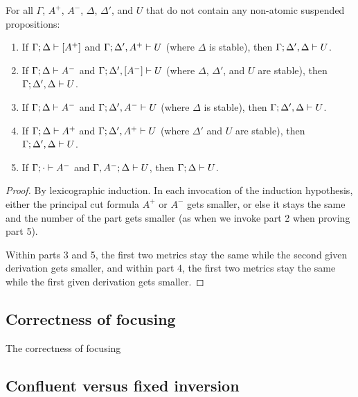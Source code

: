 \bigskip
\begin{theorem}\label{thm:lincut}
For all $\Gamma$, $A^+$, $A^-$, $\Delta$, $\Delta'$, and $U$ that
do not contain any non-atomic suspended propositions:
\begin{enumerate}
\item If ${\Gamma};{\Delta} \vdash {[A^+]} \mathstrut$
      and ${\Gamma};{\Delta',A^+} \vdash {U} \mathstrut$
      (where $\Delta$ is stable), 
      then ${\Gamma};{\Delta',\Delta} \vdash {U} \mathstrut$.
\item If ${\Gamma};{\Delta} \vdash {A^-} \mathstrut$
      and ${\Gamma};{\Delta', [A^-]} \vdash {U} \mathstrut$
      (where $\Delta$, $\Delta'$, and $U$ are stable),
      then ${\Gamma};{\Delta',\Delta} \vdash {U} \mathstrut$. 
\item If ${\Gamma};{\Delta} \vdash {A^-} \mathstrut$
      and ${\Gamma};{\Delta', A^-} \vdash {U} \mathstrut$
      (where $\Delta$ is stable), 
      then ${\Gamma};{\Delta',\Delta} \vdash {U} \mathstrut$. 
\item If ${\Gamma};{\Delta} \vdash {A^+} \mathstrut$
      and ${\Gamma};{\Delta', A^+} \vdash {U} \mathstrut$
      (where $\Delta'$ and $U$ are stable),
      then ${\Gamma};{\Delta',\Delta} \vdash {U} \mathstrut$. 
\item If ${\Gamma};{\cdot} \vdash {A^-} \mathstrut$
      and ${\Gamma, A^-};{\Delta} \vdash {U} \mathstrut$,
      then ${\Gamma};{\Delta} \vdash {U} \mathstrut$. 
\end{enumerate}
\end{theorem}

\begin{proof}
By lexicographic induction. In each invocation of the induction
hypothesis, either the principal cut formula $A^+$ or $A^-$ gets 
smaller, or else it stays the same and the number of the part
gets smaller (as when we invoke part 2 when proving part 5). 

Within parts 3 and 5, the first two metrics stay the same while the
second given derivation gets smaller, and within part 4, the first two
metrics stay the same while the first given derivation gets smaller.
\end{proof}

\subsection{Correctness of focusing}

The correctness of focusing 

\subsection{Confluent versus fixed inversion}
\label{sec:confluent-v-fixed}

